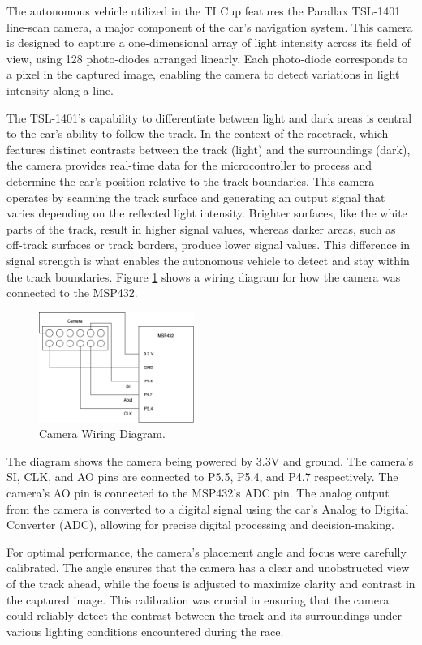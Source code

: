\documentclass[conference]{IEEEtran}
\begin{document}
The autonomous vehicle utilized in the TI Cup features the Parallax TSL-1401 line-scan camera, a major component of the car's navigation system. This camera is designed to capture a one-dimensional array of light intensity across its field of view, using 128 photo-diodes arranged linearly. Each photo-diode corresponds to a pixel in the captured image, enabling the camera to detect variations in light intensity along a line.

The TSL-1401's capability to differentiate between light and dark areas is central to the car's ability to follow the track. In the context of the racetrack, which features distinct contrasts between the track (light) and the surroundings (dark), the camera provides real-time data for the microcontroller to process and determine the car's position relative to the track boundaries. This camera operates by scanning the track surface and generating an output signal that varies depending on the reflected light intensity. Brighter surfaces, like the white parts of the track, result in higher signal values, whereas darker areas, such as off-track surfaces or track borders, produce lower signal values. This difference in signal strength is what enables the autonomous vehicle to detect and stay within the track boundaries. Figure \ref{fig:camera} shows a wiring diagram for how the camera was connected to the MSP432.

\begin{figure}[htbp]
	\centerline{\includegraphics[width=0.45\textwidth]{images/cameraWiring.png}}
	\caption{Camera Wiring Diagram.}
	\label{fig:camera}
\end{figure}

The diagram shows the camera being powered by 3.3V and ground. The camera's SI, CLK, and AO pins are connected to P5.5, P5.4, and P4.7 respectively. The camera's AO pin is connected to the MSP432's ADC pin. The analog output from the camera is converted to a digital signal using the car's Analog to Digital Converter (ADC), allowing for precise digital processing and decision-making.

For optimal performance, the camera's placement angle and focus were carefully calibrated. The angle ensures that the camera has a clear and unobstructed view of the track ahead, while the focus is adjusted to maximize clarity and contrast in the captured image. This calibration was crucial in ensuring that the camera could reliably detect the contrast between the track and its surroundings under various lighting conditions encountered during the race.
\end{document}
